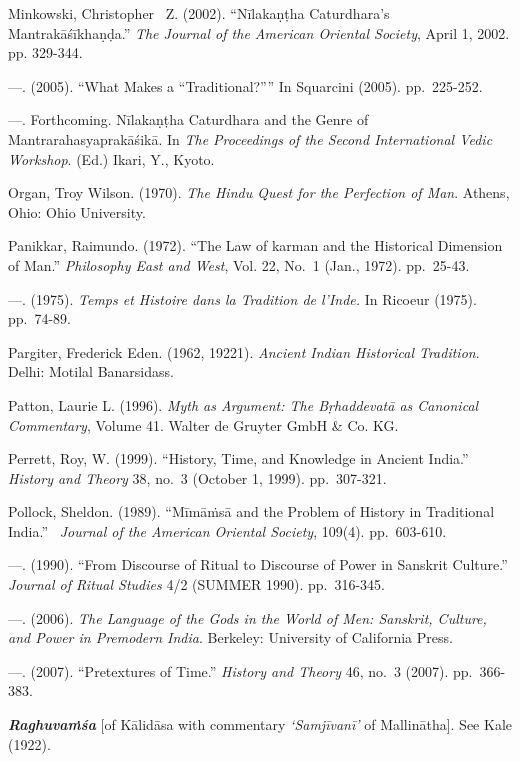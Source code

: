 \begin{thebibliography}{99}
  Minkowski, Christopher  Z. (2002). “Nīlakaṇṭha Caturdhara's Mantrakāśīkhaṇḍa.” \textit{The Journal of the American Oriental Society}, April 1, 2002. pp. 329-344.

  —. (2005). “What Makes a “Traditional?”” In Squarcini (2005). pp.~225-252.

  —. Forthcoming. Nīlakaṇṭha Caturdhara and the Genre of Mantrarahasyaprakāśikā. In \textit{The Proceedings of the Second International Vedic Workshop}. (Ed.) Ikari, Y., Kyoto.

  Organ, Troy Wilson. (1970). \textit{The Hindu Quest for the Perfection of Man}. Athens, Ohio: Ohio University.

  Panikkar, Raimundo. (1972). “The Law of karman and the Historical Dimension of Man.” \textit{Philosophy East and West}, Vol. 22, No.~1 (Jan., 1972). pp.~25-43.

  —. (1975). \textit{Temps et Histoire dans la Tradition de l’Inde.} In Ricoeur (1975). pp.~74-89.

  Pargiter, Frederick Eden. (1962, 19221). \textit{Ancient Indian Historical Tradition}. Delhi: Motilal Banarsidass.

  Patton, Laurie L. (1996). \textit{Myth as Argument: The Bṛhaddevatā as Canonical Commentary}, Volume 41. Walter de Gruyter GmbH \& Co. KG.

  Perrett, Roy, W. (1999). “History, Time, and Knowledge in Ancient India.” \textit{History and Theory} 38, no.~3 (October 1, 1999). pp.~307-321.

  Pollock, Sheldon. (1989). “Mīmāṁsā and the Problem of History in Traditional India.”  \textit{Journal of the American Oriental Society}, 109(4). pp.~603-610.

  —. (1990). “From Discourse of Ritual to Discourse of Power in Sanskrit Culture.” \textit{Journal of Ritual Studies} 4/2 (SUMMER 1990). pp.~316-345.

  —. (2006). \textit{The Language of the Gods in the World of Men: Sanskrit, Culture, and Power in Premodern India}. Berkeley: University of California Press.

  —. (2007). “Pretextures of Time.” \textit{History and Theory} 46, no.~3 (2007). pp.~366-383.

  \textbf{\textit{Raghuvaṁśa}} [of Kālidāsa with commentary \textit{‘Samjīvanī’} of Mallinātha]. See Kale (1922).


\end{thebibliography}

